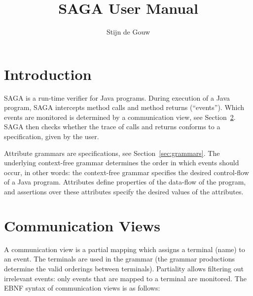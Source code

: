 \documentclass{article}
\begin{document}
\title{SAGA User Manual}
\date{}

\author{Stijn de Gouw}
\maketitle

\section{Introduction}
SAGA is a run-time verifier for Java programs.  During execution of a Java program, SAGA intercepts method calls and method returns (``events'').  Which events are monitored is determined by a communication view, see Section~\ref{sec:views}. SAGA then checks whether the trace of calls and returns conforms to a specification, given by the user.

Attribute grammars are specifications, see Section~\ref{sec:grammars}.  The underlying context-free grammar determines the order in which events should occur,  in other words: the context-free grammar specifies the desired control-flow of a Java program.  Attributes define properties of the data-flow of the program,  and assertions over these attributes specify the desired values of the attributes.

\section{Communication Views}
\label{sec:views}
A communication view is a partial mapping which assigns a terminal (name) to an event. The terminals are used in the grammar (the grammar productions determine the valid orderings between terminals).  Partiality allows filtering out irrelevant events: only events that are mapped to a terminal are monitored.  The EBNF syntax of communication views is as follows:
\end{document}
